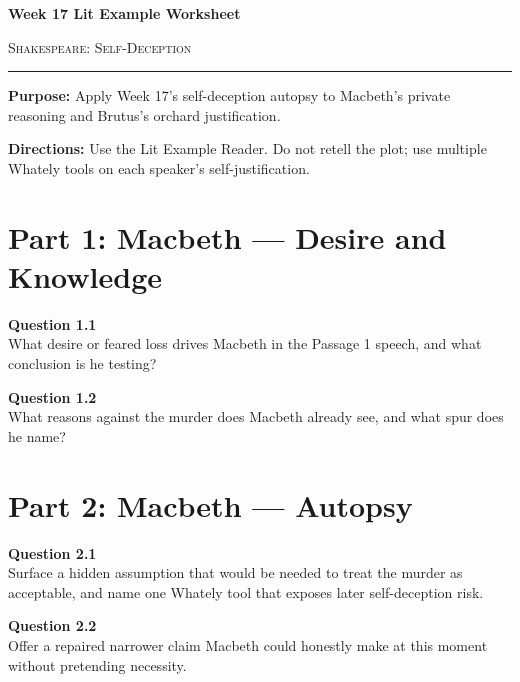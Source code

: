 \documentclass[12pt]{article}
\begin{document}
\begin{center}
{\LARGE\bfseries Week 17 Lit Example Worksheet}\par\vspace{0.05em}
{\large\scshape Shakespeare: Self-Deception}\par\vspace{0.12em}
\rule{0.78\textwidth}{0.5pt}
\end{center}

\textbf{Purpose:} Apply Week 17's self-deception autopsy to Macbeth's private reasoning and Brutus's orchard justification.

\textbf{Directions:} Use the Lit Example Reader. Do not retell the plot; use multiple Whately tools on each speaker's self-justification.

\section*{Part 1: Macbeth --- Desire and Knowledge}

\textbf{Question 1.1}\\[-0.15em]
What desire or feared loss drives Macbeth in the Passage 1 speech, and what conclusion is he testing?


\textbf{Question 1.2}\\[-0.15em]
What reasons against the murder does Macbeth already see, and what spur does he name?


\newpage

\section*{Part 2: Macbeth --- Autopsy}

\textbf{Question 2.1}\\[-0.15em]
Surface a hidden assumption that would be needed to treat the murder as acceptable, and name one Whately tool that exposes later self-deception risk.


\textbf{Question 2.2}\\[-0.15em]
Offer a repaired narrower claim Macbeth could honestly make at this moment without pretending necessity.


\newpage
\end{document}
